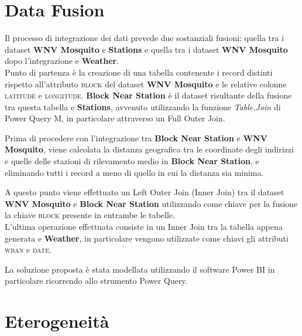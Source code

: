 \section{Data Fusion}
Il processo di integrazione dei dati prevede due sostanziali fusioni: quella tra i dataset \textbf{WNV Mosquito} e \textbf{Stations} e quella tra i dataset \textbf{WNV Mosquito} dopo l'integrazione e \textbf{Weather}.\\ 

Punto di partenza è la creazione di una tabella contenente i record distinti rispetto all'attributo \textsc{block} del dataset \textbf{WNV Mosquito} e le relative colonne \textsc{latitude} e \textsc{longitude}. 
\textbf{Block Near Station} è il dataset risultante della fusione tra questa tabella e \textbf{Stations}, avvenuto utilizzando la funzione \textit{Table.Join} di Power Query M, in particolare attraverso un Full Outer Join. 

Prima di procedere con l'integrazione tra \textbf{Block Near Station} e \textbf{WNV Mosquito}, viene calcolata la distanza geografica tra le coordinate degli indirizzi e quelle delle stazioni di rilevamento medio in \textbf{Block Near Station}, e eliminando tutti i record a meno di quello in cui la distanza sia minima.

A questo punto viene effettuato un Left Outer Join (Inner Join) tra il dataset \textbf{WNV Mosquito} e \textbf{Block Near Station} utilizzando come chiave per la fusione la chiave \textsc{block} presente in entrambe le tabelle.\\


L'ultima operazione effettuata consiste in un Inner Join tra la tabella appena generata e \textbf{Weather}, in particolare vengono utilizzate come chiavi gli attributi \textsc{wban} e \textsc{date}.

La soluzione proposta è stata modellata utilizzando il software Power BI in particolare ricorrendo allo strumento Power Query.

\section{Eterogeneità}